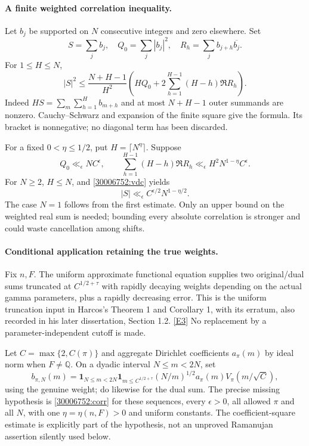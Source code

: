\documentclass[11pt,a4paper]{article}
\newcommand{\Q}{\mathbb{Q}}
\newcommand{\eref}[2]{\hyperlink{extra:#1:#2}{[E#2]}}
\numberwithin{equation}{section}
\begin{document}
\paragraph{A finite weighted correlation inequality.}
Let $b_j$ be supported on $N$ consecutive integers and zero elsewhere. Set
\[
 S=\sum_jb_j,\quad Q_0=\sum_j|b_j|^2,\quad
 R_h=\sum_jb_{j+h}\overline{b_j}.
\]
For $1\le H\le N$,
\begin{equation}\label{30006752:vdc}
 |S|^2\le\frac{N+H-1}{H^2}
 \left(HQ_0+2\sum_{h=1}^{H-1}(H-h)\Re R_h\right).
\end{equation}
Indeed $HS=\sum_m\sum_{h=1}^H b_{m+h}$ and at most $N+H-1$ outer summands
are nonzero. Cauchy--Schwarz and expansion of the finite square give the
formula. Its bracket is nonnegative; no diagonal term has been discarded.

For a fixed $0<\eta\le1/2$, put $H=\lceil N^\eta\rceil$. Suppose
\begin{equation}\label{30006752:corr}
 Q_0\ll_\epsilon NC^\epsilon,\qquad
 \sum_{h=1}^{H-1}(H-h)\Re R_h
       \ll_\epsilon H^2N^{1-\eta}C^\epsilon.
\end{equation}
For $N\ge2$, $H\le N$, and \eqref{30006752:vdc} yields
\[
 |S|\ll_\epsilon C^{\epsilon/2}N^{1-\eta/2}.
\]
The case $N=1$ follows from the first estimate. Only an upper bound on the
weighted real sum is needed; bounding every absolute correlation is
stronger and could waste cancellation among shifts.

\paragraph{Conditional application retaining the true weights.}
Fix $n,F$. The uniform approximate functional equation supplies two
original/dual sums truncated at $C^{1/2+\tau}$ with rapidly decaying weights
depending on the actual gamma parameters, plus a rapidly decreasing error.
This is the uniform truncation input in Harcos's Theorem 1 and Corollary 1,
with its erratum, also recorded in his later dissertation, Section 1.2.
\eref{30006752}{3} No replacement by a parameter-independent cutoff is made.

Let $C=\max\{2,C(\pi)\}$ and aggregate Dirichlet coefficients $a_\pi(m)$
by ideal norm when $F\ne\Q$. On a dyadic interval $N\le m<2N$, set
\[
 b_{\pi,N}(m)=\mathbf1_{N\le m<2N}\mathbf1_{m\le C^{1/2+\tau}}
       (N/m)^{1/2}a_\pi(m)V_\pi(m/\sqrt C),
\]
using the genuine weight; do likewise for the dual sum. The precise missing
hypothesis is \eqref{30006752:corr} for these sequences, every $\epsilon>0$,
all allowed $\pi$ and all $N$, with one $\eta=\eta(n,F)>0$ and uniform
constants. The coefficient-square estimate is explicitly part of the
hypothesis, not an unproved Ramanujan assertion silently used below.
\end{document}
